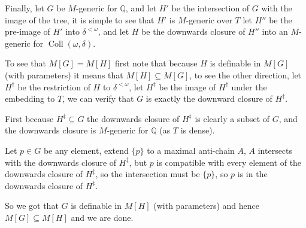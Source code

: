 \begin{cExercise}
	Finally, let $G$ be $M$-generic for $\mathbb Q$, and let $H'$ be the intersection of $G$ with the image of the tree, it is simple to see that $H'$ is $M$-generic over $T$ let $H''$ be the pre-image of $H'$ into $\delta^{<\omega}$, and let $H$ be the downwards closure of $H''$ into an $M$-generic for $\operatorname{Coll}(\omega,\delta)$.
	
	To see that $M[G]=M[H]$ first note that because $H$ is definable in $M[G]$ (with parameters) it means that $M[H]\subseteq M[G]$, to see the other direction, let $H^\dagger$ be the restriction of $H$ to $\delta^{<\omega}$, let $H^{\ddagger}$ be the image of $H^{\dagger}$ under the embedding to $T$, we can verify that $G$ is exactly the downward closure of $H^\ddagger$.
	
	First because $H^\ddagger\subseteq G$ the downwards closure of $H^\ddagger$ is clearly a subset of $G$, and the downwards closure is $M$-generic for $\mathbb Q$ (as $T$ is dense).
	
	Let $p\in G$ be any element, extend $\{p\}$ to a maximal anti-chain $A$, $A$ intersects with the downwards closure of $H^\ddagger$, but $p$ is compatible with every element of the downwards closure of $H^\ddagger$, so the intersection must be $\{p\}$, so $p$ is in the downwards closure of $H^\ddagger$.
	
	So we got that $G$ is definable in $M[H]$ (with parameters) and hence $M[G]\subseteq M[H]$ and we are done.
\end{cExercise}






